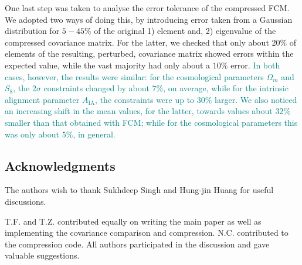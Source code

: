 \documentclass[twocolumn]{\docclass}
\newcommand\full{FCM}
\begin{document}
	One last step was taken to analyse the error tolerance of the compressed \full. We adopted two ways of doing this, by introducing error taken from a Gaussian distribution for $5 - 45 \%$ of the original 1) element and, 2) eigenvalue of the compressed covariance matrix. For the latter, we checked that only about $20 \%$ of elements of the resulting, perturbed, covariance matrix showed errors within the expected value, while the vast majority had only about a $10\%$ error. \textcolor{teal}{In both cases, however, the results were similar: for the cosmological parameters $\Omega_m$ and $S_8$, the $2\sigma$ constraints changed by about $7\%$, on average, while for the intrinsic alignment parameter $A_{\mathrm{IA}}$, the constraints were up to $30\%$ larger. We also noticed an increasing shift in the mean values, for the latter, towards values about $32\%$ smaller than that obtained with \full; while for the cosmological parameters this was only about $5\%$, in general.}
	
	
	\subsection*{Acknowledgments}
	
	The authors wish to thank Sukhdeep Singh and Hung-jin Huang for useful discussions.
	
	
	
	 
	
	T.F. and T.Z. contributed equally on writing the main paper as well as implementing the covariance comparison and compression. N.C. contributed to the compression code. All authors participated in the discussion and gave valuable suggestions.
	
	
	
	
\end{document}
